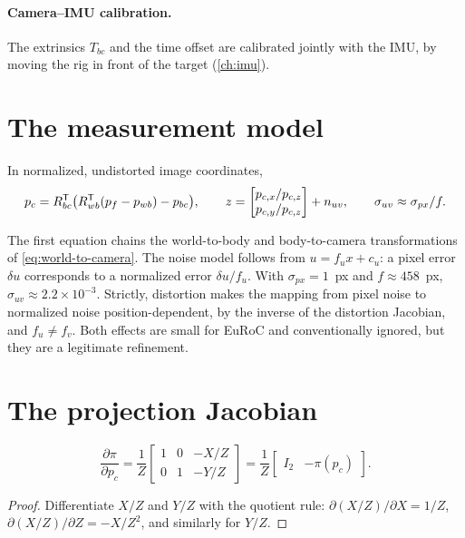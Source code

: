 \paragraph{Camera--IMU calibration.} The extrinsics $T_{bc}$ and the time offset are calibrated jointly with the IMU, by moving the rig in front of the target
(\cref{ch:imu}).

\section{The measurement model}

\begin{convention}
In normalized, undistorted image coordinates,
\begin{equation}
  p_c = R_{bc}^{\mathsf{T}}\big(R_{wb}^{\mathsf{T}}(p_f - p_{wb}) - p_{bc}\big), \qquad
  z = \begin{bmatrix} p_{c,x}/p_{c,z} \\ p_{c,y}/p_{c,z} \end{bmatrix} + n_{uv},
  \qquad \sigma_{uv} \approx \sigma_{px}/f .
\end{equation}
\end{convention}

The first equation chains the world-to-body and body-to-camera transformations of \eqref{eq:world-to-camera}. The noise model follows from $u = f_u x + c_u$: a pixel
error $\delta u$ corresponds to a normalized error $\delta u/f_u$. With $\sigma_{px} = 1$~px and $f \approx 458$~px, $\sigma_{uv} \approx 2.2\times10^{-3}$. Strictly, distortion makes the
mapping from pixel noise to normalized noise position-dependent, by the inverse of the distortion Jacobian, and $f_u \neq f_v$. Both effects are small for EuRoC and
conventionally ignored, but they are a legitimate refinement.

\section{The projection Jacobian}

\begin{proposition}
\label{prop:proj-jacobian}
\begin{equation}
  \frac{\partial\pi}{\partial p_c} = \frac{1}{Z}\begin{bmatrix} 1 & 0 & -X/Z \\ 0 & 1 & -Y/Z \end{bmatrix}
  = \frac1Z\begin{bmatrix} I_2 & -\pi(p_c) \end{bmatrix}.
\end{equation}
\end{proposition}
\begin{proof}
Differentiate $X/Z$ and $Y/Z$ with the quotient rule: $\partial(X/Z)/\partial X = 1/Z$, $\partial(X/Z)/\partial Z = -X/Z^2$, and similarly for $Y/Z$.
\end{proof}

